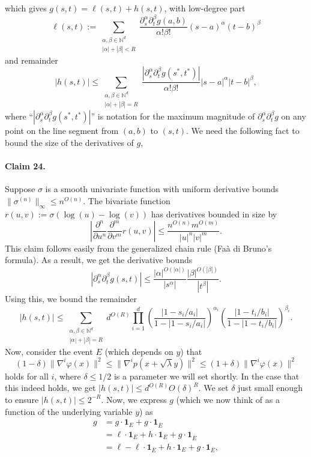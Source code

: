 \documentclass[10pt,a4paper]{article}
\begin{document}
which gives $g(s,t)=\ell(s,t)+h(s,t)$, with low-degree part
\[\ell(s,t):=\sum_{\substack{\alpha,\beta\in\mathbb N^d\\|\alpha|+|\beta|<R}}\frac{\partial_s^\alpha\partial_t^\beta g(a,b)}{\alpha!\beta!}(s-a)^\alpha(t-b)^\beta\]
and remainder
\[|h(s,t)|\leq\sum_{\substack{\alpha,\beta\in\mathbb N^d\\|\alpha|+|\beta|=R}}\frac{|\partial_s^\alpha\partial_t^\beta g(s^*,t^*)|}{\alpha!\beta!}|s-a|^\alpha|t-b|^\beta,\]
where ``$|\partial_s^\alpha\partial_t^\beta g(s^*,t^*)|$'' is notation for the maximum magnitude of $\partial_s^\alpha\partial_t^\beta g$ on any point on the line segment from $(a,b)$ to $(s,t)$. We need the following fact to bound the size of the derivatives of $g$,
\paragraph{Claim 24.} Suppose $\sigma$ is a smooth univariate function with uniform derivative bounds $\|\sigma^{(n)}\|_\infty\leq n^{O(n)}$. The bivariate function $r(u,v):=\sigma(\log(u)-\log(v))$ has derivatives bounded in size by
\[\left|\frac{\partial^n}{\partial u^n}\frac{\partial^m}{\partial v^m}r(u,v)\right|\leq\frac{n^{O(n)}m^{O(m)}}{|u|^n|v|^m}.\]
This claim follows easily from the generalized chain rule (Faà di Bruno's formula). As a result, we get the derivative bounds
\[|\partial_s^\alpha\partial_t^\beta g(s,t)|\leq\frac{|\alpha|^{O(|\alpha|)}}{|s^\alpha|}\frac{|\beta|^{O(|\beta|)}}{|t^\beta|}.\]
Using this, we bound the remainder
\[|h(s,t)|\leq\sum_{\substack{\alpha,\beta\in\mathbb N^d\\|\alpha|+|\beta|=R}}d^{O(R)}\prod_{i=1}^d\left(\frac{|1-s_i/a_i|}{1-|1-s_i/a_i|}\right)^{\alpha_i}\left(\frac{|1-t_i/b_i|}{1-|1-t_i/b_i|}\right)^{\beta_i}.\]
Now, consider the event $E$ (which depends on $y$) that
\[(1-\delta)\|\nabla^i\varphi(x)\|^2\leq\|\nabla^ip(x+\sqrt\lambda y)\|^2\leq(1+\delta)\|\nabla^i\varphi(x)\|^2\]
holds for all $i$, where $\delta\leq1/2$ is a parameter we will set shortly. In the case that this indeed holds, we get $|h(s,t)|\leq d^{O(R)}O(\delta)^R$.
We set $\delta$ just small enough to ensure $|h(s,t)|\leq2^{-R}$.
Now, we express $g$ (which we now think of as a function of the underlying variable $y$) as
\begin{align*}
g&=g\cdot\boldsymbol1_E+g\cdot\boldsymbol1_{\overline E}\\
&=\ell\cdot\boldsymbol1_E+h\cdot\boldsymbol1_E+g\cdot\boldsymbol1_{\overline E}\\
&=\ell-\ell\cdot\boldsymbol1_{\overline E}+h\cdot\boldsymbol1_E+g\cdot\boldsymbol1_{\overline E},
\end{align*}
\end{document}
